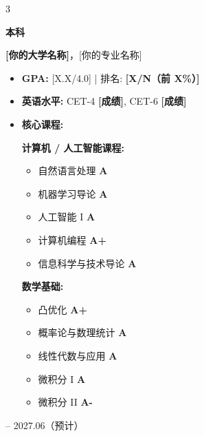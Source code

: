 \documentclass[10pt, letterpaper]{article}
\newenvironment{highlights}{
    \begin{itemize}[
        topsep=0.10 cm,
        parsep=0.10 cm,
        partopsep=0pt,
        itemsep=0pt,
        leftmargin=0.4 cm + 10pt
    ]
}{\end{itemize}} %
\newenvironment{threecolentry}[3][]{\onecolentry
    \def\thirdColumn{#3}
    \setcolumnwidth{1.2 cm, \fill, 4.5 cm}
    \begin{paracol}{3}
    {\raggedright #2} \switchcolumn
}{\switchcolumn \raggedleft \thirdColumn
    \end{paracol}
    \endonecolentry} %
\begin{document}
        \begin{threecolentry}{\textbf{本科}}{
            2023.09 -- 2027.06（预计）
        }
            \textbf{[你的大学名称]}，[你的专业名称]
            \begin{highlights}
                \item \textbf{GPA:} [X.X/4.0] | 排名: \textbf{[X/N（前 X\%）]} %
                \item \textbf{英语水平:} CET-4 \textbf{[成绩]}, CET-6 \textbf{[成绩]} %
                \item \textbf{核心课程:}\par\vspace{0.05cm}
                \noindent
                \begin{minipage}[t]{0.47\linewidth}
                    \textbf{计算机 / 人工智能课程:}
                    \begin{itemize}[topsep=0.05cm, parsep=0pt, itemsep=0pt, leftmargin=1.1em]
                        \item 自然语言处理 \hfill \textbf{A}
                        \item 机器学习导论 \hfill \textbf{A}
                        \item 人工智能 I \hfill \textbf{A}
                        \item 计算机编程 \hfill \textbf{A+}
                        \item 信息科学与技术导论 \hfill \textbf{A}
                    \end{itemize}
                \end{minipage}\hfill
                \begin{minipage}[t]{0.47\linewidth}
                    \textbf{数学基础:}
                    \begin{itemize}[topsep=0.05cm, parsep=0pt, itemsep=0pt, leftmargin=1.1em]
                        \item 凸优化 \hfill \textbf{A+}
                        \item 概率论与数理统计 \hfill \textbf{A}
                        \item 线性代数与应用 \hfill \textbf{A}
                        \item 微积分 I \hfill \textbf{A}
                        \item 微积分 II \hfill \textbf{A-}
                    \end{itemize}
                \end{minipage}
            \end{highlights}
        \end{threecolentry}
\end{document}
